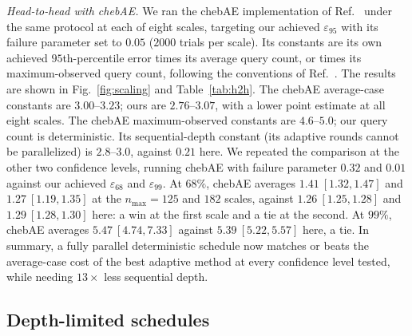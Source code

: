 \documentclass[%
 twocolumn,
 amsmath,amssymb,
prx,
longbibliography
]{revtex4-2}
\begin{document}
\emph{Head-to-head with chebAE.} We ran the chebAE implementation of Ref.~\cite{Rall2023amplitudeestimation} under the same protocol at each of eight scales, targeting our achieved $\varepsilon_{95}$ with its failure parameter set to $0.05$ ($2000$ trials per scale). Its constants are its own achieved $95$th-percentile error times its average query count, or times its maximum-observed query count, following the conventions of Ref.~\cite{labib2024csae}. The results are shown in Fig.~\ref{fig:scaling} and Table~\ref{tab:h2h}. The chebAE average-case constants are $3.00$--$3.23$; ours are $2.76$--$3.07$, with a lower point estimate at all eight scales. The chebAE maximum-observed constants are $4.6$--$5.0$; our query count is deterministic. Its sequential-depth constant (its adaptive rounds cannot be parallelized) is $2.8$--$3.0$, against $0.21$ here. We repeated the comparison at the other two confidence levels, running chebAE with failure parameter $0.32$ and $0.01$ against our achieved $\varepsilon_{68}$ and $\varepsilon_{99}$. At $68\%$, chebAE averages $1.41\ [1.32, 1.47]$ and $1.27\ [1.19, 1.35]$ at the $n_{\max} = 125$ and $182$ scales, against $1.26\ [1.25, 1.28]$ and $1.29\ [1.28, 1.30]$ here: a win at the first scale and a tie at the second. At $99\%$, chebAE averages $5.47\ [4.74, 7.33]$ against $5.39\ [5.22, 5.57]$ here, a tie. In summary, a fully parallel deterministic schedule now matches or beats the average-case cost of the best adaptive method at every confidence level tested, while needing $13\times$ less sequential depth.

\subsection{Depth-limited schedules}\label{subsec:depthnum}
\end{document}
